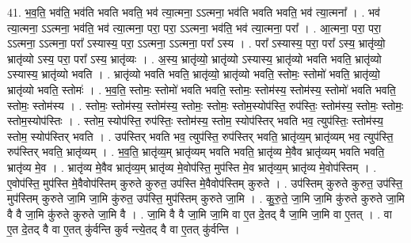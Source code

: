 \documentclass[17pt]{extarticle}
\begin{document}
41. भ॒व॒ति॒ भव॑ति॒ भव॑ति भवति भवति॒ भव॑ त्या॒त्मना॒ ऽऽत्मना॒ भव॑ति भवति भवति॒ भव॑ त्या॒त्मना᳚ । . भव॑ त्या॒त्मना॒ ऽऽत्मना॒ भव॑ति॒ भव॑ त्या॒त्मना॒ परा॒ परा॒ ऽऽत्मना॒ भव॑ति॒ भव॑ त्या॒त्मना॒ परा᳚ । . आ॒त्मना॒ परा॒ परा॒ ऽऽत्मना॒ ऽऽत्मना॒ परा᳚ ऽस्यास्य॒ परा॒ ऽऽत्मना॒ ऽऽत्मना॒ परा᳚ ऽस्य । . परा᳚ ऽस्यास्य॒ परा॒ परा᳚ ऽस्य॒ भ्रातृ॑व्यो॒ भ्रातृ॑व्यो ऽस्य॒ परा॒ परा᳚ ऽस्य॒ भ्रातृ॑व्यः । . अ॒स्य॒ भ्रातृ॑व्यो॒ भ्रातृ॑व्यो ऽस्यास्य॒ भ्रातृ॑व्यो भवति भवति॒ भ्रातृ॑व्यो ऽस्यास्य॒ भ्रातृ॑व्यो भवति । . भ्रातृ॑व्यो भवति भवति॒ भ्रातृ॑व्यो॒ भ्रातृ॑व्यो भवति॒ स्तोमः॒ स्तोमो॑ भवति॒ भ्रातृ॑व्यो॒ भ्रातृ॑व्यो भवति॒ स्तोमः॑ । . भ॒व॒ति॒ स्तोमः॒ स्तोमो॑ भवति भवति॒ स्तोमः॒ स्तोम॑स्य॒ स्तोम॑स्य॒ स्तोमो॑ भवति भवति॒ स्तोमः॒ स्तोम॑स्य । . स्तोमः॒ स्तोम॑स्य॒ स्तोम॑स्य॒ स्तोमः॒ स्तोमः॒ स्तोम॒स्योप॑स्ति॒ रुप॑स्तिः॒ स्तोम॑स्य॒ स्तोमः॒ स्तोमः॒ 
स्तोम॒स्योप॑स्तिः । . स्तोम॒ स्योप॑स्ति॒ रुप॑स्तिः॒ स्तोम॑स्य॒ स्तोम॒ स्योप॑स्तिर् भवति भव॒ त्युप॑स्तिः॒ स्तोम॑स्य॒ स्तोम॒ स्योप॑स्तिर् भवति । . उप॑स्तिर् भवति भव॒ त्युप॑स्ति॒ रुप॑स्तिर् भवति॒ भ्रातृ॑व्य॒म् भ्रातृ॑व्यम् भव॒ त्युप॑स्ति॒ रुप॑स्तिर् भवति॒ भ्रातृ॑व्यम् । . भ॒व॒ति॒ भ्रातृ॑व्य॒म् भ्रातृ॑व्यम् भवति भवति॒ भ्रातृ॑व्य मे॒वैव भ्रातृ॑व्यम् भवति भवति॒ भ्रातृ॑व्य मे॒व । . भ्रातृ॑व्य मे॒वैव भ्रातृ॑व्य॒म् भ्रातृ॑व्य मे॒वोप॑स्ति॒ मुप॑स्ति मे॒व भ्रातृ॑व्य॒म् भ्रातृ॑व्य मे॒वोप॑स्तिम् । . ए॒वोप॑स्ति॒ मुप॑स्ति मे॒वैवोप॑स्तिम् कुरुते कुरुत॒ उप॑स्ति मे॒वैवोप॑स्तिम् कुरुते । . उप॑स्तिम् कुरुते कुरुत॒ उप॑स्ति॒ मुप॑स्तिम् कुरुते जा॒मि जा॒मि कु॑रुत॒ उप॑स्ति॒ मुप॑स्तिम् कुरुते जा॒मि । . कु॒रु॒ते॒ जा॒मि जा॒मि कु॑रुते कुरुते जा॒मि वै वै जा॒मि कु॑रुते कुरुते जा॒मि वै । . जा॒मि वै वै जा॒मि जा॒मि वा ए॒त दे॒तद् वै जा॒मि जा॒मि वा ए॒तत् । . वा ए॒त दे॒तद् वै वा ए॒तत् कु॑र्वन्ति कुर्व न्त्ये॒तद् वै वा ए॒तत् कु॑र्वन्ति । \newline
\pagebreak
{}
\end{document}
